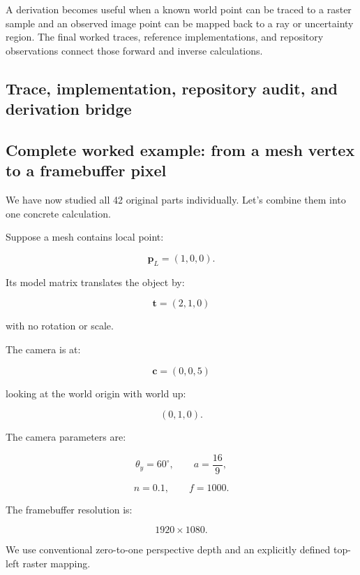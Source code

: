 A derivation becomes useful when a known world point can be traced to a raster sample and an observed image point can be mapped back to a ray or uncertainty region. The final worked traces, reference implementations, and repository observations connect those forward and inverse calculations.

\subsection{Trace, implementation, repository audit, and derivation bridge}\label{02-foundations-ii-ch037-trace-implementation-repository-audit-and-derivation-bridge}

\hypertarget{02-foundations-ii-ch037-trace-implementation-repository-audit-and-derivation-bridge}{}

\subsection{Complete worked example: from a mesh vertex to a framebuffer pixel}\label{02-foundations-ii-ch037-complete-worked-example-from-a-mesh-vertex-to-a-framebuffer-pixel}

\hypertarget{02-foundations-ii-ch037-complete-worked-example-from-a-mesh-vertex-to-a-framebuffer-pixel}{}

We have now studied all 42 original parts individually. Let's combine them into one concrete calculation.

Suppose a mesh contains local point:

\[
 \boxed{ \mathbf p_L=(1,0,0) }.
\]

Its model matrix translates the object by:

\[
 \mathbf t=(2,1,0)
\]

with no rotation or scale.

The camera is at:

\[
 \mathbf c=(0,0,5)
\]

looking at the world origin with world up:

\[
 (0,1,0).
\]

The camera parameters are:

\[
 \theta_y=60^\circ, \qquad a=\frac{16}{9},
\]

\[
 n=0.1,\qquad f=1000.
\]

The framebuffer resolution is:

\[
 1920\times1080.
\]

We use conventional zero-to-one perspective depth and an explicitly defined top-left raster mapping.

